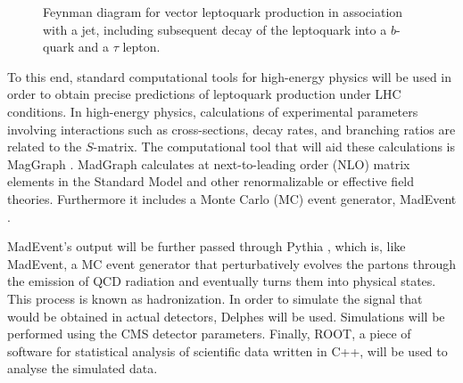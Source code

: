 \begin{figure}[h]
    \centering
    \begin{center}
\end{center}
    \caption{Feynman diagram for vector leptoquark production in association with a jet, including subsequent decay of the leptoquark into a $b$-quark and a $\tau$ lepton.}
    \label{fig:vbf}
\end{figure}

To this end, standard computational tools for high-energy physics will be used in order to obtain precise predictions of leptoquark production under LHC conditions. In high-energy physics, calculations of experimental parameters involving interactions such as cross-sections, decay rates, and branching ratios are related to the $S$-matrix. The computational tool that will aid these calculations is MagGraph \cite{automated-alwall-2014, MadGraph5}. MadGraph calculates at next-to-leading order (NLO) matrix elements in the Standard Model and other renormalizable or effective field theories. Furthermore it includes a Monte Carlo (MC) event generator, MadEvent \cite{MadEvent}. 

MadEvent's output will be further passed through Pythia \cite{sjostrand_pythia_2006}, which is, like MadEvent, a MC event generator that perturbatively evolves the partons through the emission of QCD radiation and eventually turns them into physical states. This process is known as hadronization. In order to simulate the signal that would be obtained in actual detectors, Delphes \cite{de_favereau_delphes_2014} will be used. Simulations will be performed using the CMS detector parameters. Finally, ROOT, a piece of software for statistical analysis of scientific data written in C++, will be used to analyse the simulated data.
